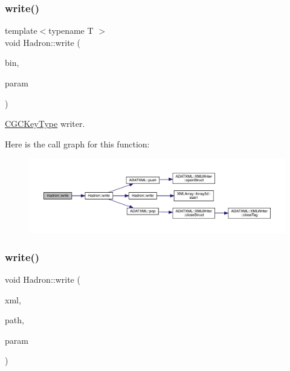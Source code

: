\subsubsection{\texorpdfstring{write()}{write()}\hspace{0.1cm}{\footnotesize\ttfamily [9/95]}}
{\footnotesize\ttfamily template$<$typename T $>$ \\
void Hadron\+::write (\begin{DoxyParamCaption}\item[{\mbox{\hyperlink{classADATIO_1_1BinaryWriter}{Binary\+Writer}} \&}]{bin,  }\item[{const \mbox{\hyperlink{structHadron_1_1CGCKeyType}{C\+G\+C\+Key\+Type}}$<$ T $>$ \&}]{param }\end{DoxyParamCaption})\hspace{0.3cm}{\ttfamily [inline]}}



\mbox{\hyperlink{structHadron_1_1CGCKeyType}{C\+G\+C\+Key\+Type}} writer. 

Here is the call graph for this function\+:
\nopagebreak
\begin{figure}[H]
\begin{center}
\leavevmode
\includegraphics[width=350pt]{d1/daf/namespaceHadron_aa23076bfdc2f1ebd99330197de102a6d_cgraph}
\end{center}
\end{figure}
\mbox{\label{namespaceHadron_a4d280edd65eda86698eae0d619c81a47}} 
\subsubsection{\texorpdfstring{write()}{write()}\hspace{0.1cm}{\footnotesize\ttfamily [10/95]}}
{\footnotesize\ttfamily void Hadron\+::write (\begin{DoxyParamCaption}\item[{\mbox{\hyperlink{classADATXML_1_1XMLWriter}{X\+M\+L\+Writer}} \&}]{xml,  }\item[{const std\+::string \&}]{path,  }\item[{const \mbox{\hyperlink{structHadron_1_1KeyHadronSUNNPartIrrep__t}{Key\+Hadron\+S\+U\+N\+N\+Part\+Irrep\+\_\+t}} \&}]{param }\end{DoxyParamCaption})}



